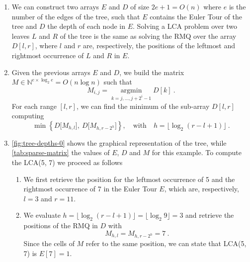 \solution
%
\begin{enumerate}

  \item We can construct two arrays $E$ and $D$ of size $2e + 1 = O(n)$ where $e$ is
  the number of the edges of the tree, such that  $E$ contains the Euler Tour of
  the tree and $D$ the depth of each node in $E$. Solving a LCA problem over two
  leaves $L$ and $R$ of the tree is the same as solving the RMQ over the array
  $D[l, r]$, where $l$ and $r$ are, respectively, the positions of the leftmost
  and rightmost occurrence of $L$ and $R$ in $E$.

  \item Given the previous arrays $E$ and $D$, we build the matrix $M \in
  \mathbb{N}^{e \times \log_2 e} = O(n\log n)$ such that $$M_{i, j} =
  \operatorname*{argmin}_{k = j, \dots, j + 2^i - 1} D[k]\ .$$ For each range
  $[l, r]$, we can find the minimum of the sub-array $D[l, r]$ computing $$\min
  \left\{ D\big[M_{h, l}\big],\ D\big[M_{h, r - 2^h}\big] \right\}, \quad
  \text{with}\quad h = \lfloor \log_2 (r - l + 1)\rfloor\ .$$

  \item \autoref{fig:tree-depths-0} shows the graphical representation of the
  tree, while \autoref{tab:sparse-matrix} the values of $E$, $D$ and $M$ for
  this example. To compute the LCA(5, 7) we proceed as follows
  \begin{enumerate}

    \item We first retrieve the position for the leftmost occurrence of 5 and
    the rightmost occurrence of 7 in the Euler Tour $E$, which are,
    respectively, $l = 3$ and $r = 11$.

    \item We evaluate $h = \lfloor\log_2 (r - l + 1) \rfloor = \lfloor\log_2 9
    \rfloor = 3$ and retrieve the positions of the RMQ in $D$ with $$M_{h, l} =
    M_{h, r - 2^h} = 7\ .$$ Since the cells of $M$ refer to the same position,
    we can state that LCA(5, 7) is $E[7] = 1$.

  \end{enumerate}
  \begin{figure}[t]
    \centering


\end{figure}
\end{enumerate}
